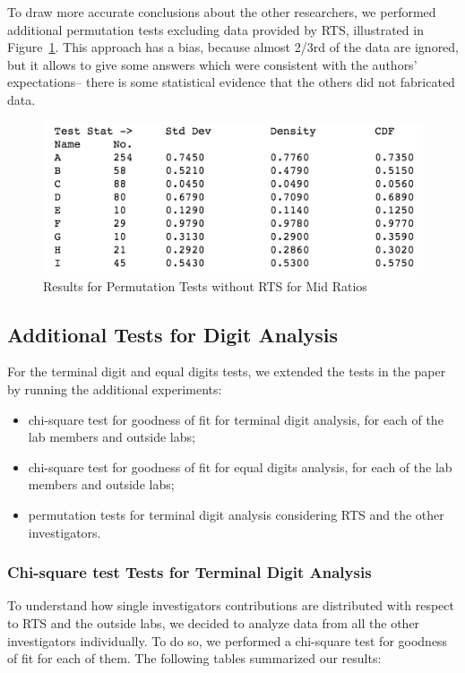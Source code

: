 \documentclass{article}
\begin{document}
To draw more accurate conclusions about the other researchers, we performed additional permutation tests excluding data provided by RTS, illustrated in Figure~\ref{fig:perm_2}.
This approach has a bias, because almost 2/3rd of the data are ignored, but it allows to give some answers which were consistent with the authors' expectations-- there is some statistical evidence that the others did not fabricated data.

\begin{figure}[htbp]
\label{fig:perm_2}
\centering
\includegraphics[width=0.8\linewidth]{images/mid_ratio_perm_no_rts.png}
\caption{Results for Permutation Tests without RTS  for Mid Ratios}
\end{figure}

    \subsection{Additional Tests for Digit
Analysis}\label{additional-tests-for-digit-analysis}

For the terminal digit and equal digits tests, we extended the tests in the paper by running the additional experiments: 
\begin{itemize}
    \item chi-square test for goodness of fit for terminal digit analysis,
for each of the lab members and outside labs;
    \item chi-square test for goodness of fit for equal digits analysis, for each of the lab members and outside labs;
    \item permutation tests for terminal digit analysis considering RTS and the other investigators.
 \end{itemize}

    \subsubsection{Chi-square test Tests for Terminal Digit
Analysis}\label{chi-square-test-tests-for-terminal-digit-analysis}

To understand how single investigators contributions are distributed
with respect to RTS and the outside labs, we decided to analyze data
from all the other investigators individually. To do so, we
performed a chi-square test for goodness of fit for each of them. The
following tables summarized our results:
\end{document}
